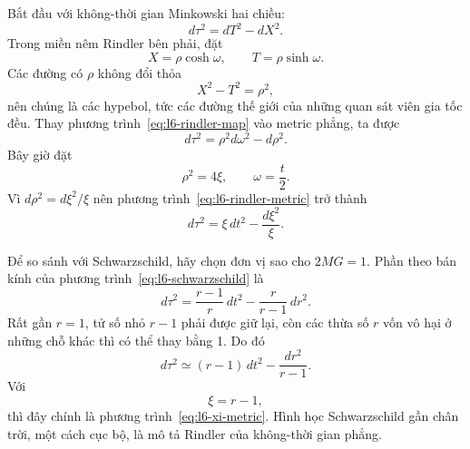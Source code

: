 Bắt đầu với không-thời gian Minkowski hai chiều:
\begin{equation}
d\tau^{2}=dT^{2}-dX^{2}.
\end{equation}
Trong miền nêm Rindler bên phải, đặt
\begin{equation}
X=\rho\cosh\omega,
\qquad
T=\rho\sinh\omega.
\label{eq:l6-rindler-map}
\end{equation}
Các đường có \(\rho\) không đổi thỏa
\begin{equation}
X^{2}-T^{2}=\rho^{2},
\end{equation}
nên chúng là các hypebol, tức các đường thế giới của những quan sát viên gia tốc đều.
Thay phương trình~\eqref{eq:l6-rindler-map} vào metric phẳng, ta được
\begin{equation}
d\tau^{2}
=\rho^{2}d\omega^{2}-d\rho^{2}.
\label{eq:l6-rindler-metric}
\end{equation}
Bây giờ đặt
\begin{equation}
\rho^{2}=4\xi,
\qquad
\omega=\frac{t}{2}.
\label{eq:l6-rindler-rescale}
\end{equation}
Vì \(d\rho^{2}=d\xi^{2}/\xi\) nên phương trình~\eqref{eq:l6-rindler-metric}
trở thành
\begin{equation}
d\tau^{2}
=\xi\,dt^{2}-\frac{d\xi^{2}}{\xi}.
\label{eq:l6-xi-metric}
\end{equation}

\begin{classroomqa}
\end{classroomqa}

Để so sánh với Schwarzschild, hãy chọn đơn vị sao cho \(2MG=1\). Phần theo bán kính của phương trình~\eqref{eq:l6-schwarzschild} là
\begin{equation}
d\tau^{2}
=
\frac{r-1}{r}\,dt^{2}
-
\frac{r}{r-1}\,dr^{2}.
\end{equation}
Rất gần \(r=1\), tử số nhỏ \(r-1\) phải được giữ lại, còn các thừa số \(r\) vốn vô hại ở những chỗ khác thì có thể thay bằng 1. Do đó
\begin{equation}
d\tau^{2}
\simeq
(r-1)\,dt^{2}
-
\frac{dr^{2}}{r-1}.
\end{equation}
Với
\begin{equation}
\xi=r-1,
\end{equation}
thì đây chính là phương trình~\eqref{eq:l6-xi-metric}. Hình học Schwarzschild gần chân trời, một cách cục bộ, là mô tả Rindler của không-thời gian phẳng.


